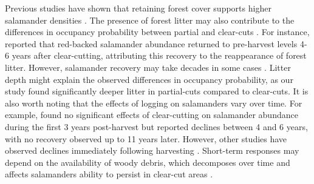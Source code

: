 Previous studies have shown that retaining forest cover supports higher salamander densities \citep{Hocking2013Effectsexperimental,Harper2015Impactforestry,Mahoney2016Woodlandsalamander}. 
The presence of forest litter may also contribute to the differences in occupancy probability between partial and clear-cuts \citep{tilghmanMetaanalysisEffectsCanopy2012}. 
For instance, \cite{Ash1997DisappearanceReturn} reported that red-backed salamander abundance returned to pre-harvest levels 4-6 years after clear-cutting, attributing this recovery to the reappearance of forest litter. 
However, salamander recovery may take decades in some cases \citep{Homyack2013Effectsrepeatedstand,Ochs2022Responseterrestrial}. 
Litter depth might explain the observed differences in occupancy probability, as our study found significantly deeper litter in partial-cuts compared to clear-cuts. 
It is also worth noting that the effects of logging on salamanders vary over time. 
For example, \cite{Ochs2022Responseterrestrial} found no significant effects of clear-cutting on salamander abundance during the first 3 years post-harvest but reported declines between 4 and 6 years, with no recovery observed up to 11 years later. 
However, other studies have observed declines immediately following harvesting \citep{deMaynadier1995relationshipforest,Macneil2014Effectstimber}. 
Short-term responses may depend on the availability of woody debris, which decomposes over time and affects salamanders ability to persist in clear-cut areas \citep{Ochs2022Responseterrestrial}. 


